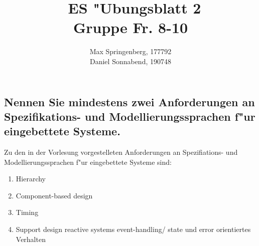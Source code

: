 \documentclass{article}
\author{Max Springenberg, 177792\\
        Daniel Sonnabend, 190748}
\title{\
    ES "Ubungsblatt 2\\
    Gruppe Fr. 8-10
    }
\date{}
\begin{document}
\maketitle
\newpage

\subsection{Nennen Sie mindestens zwei Anforderungen an Spezifikations- und 
            Modellierungssprachen f"ur eingebettete Systeme.}

Zu den in der Vorlesung vorgestelleten Anforderungen an Spezifiations- und 
    Modellierungssprachen f"ur eingebettete Systeme sind:\\
\begin{enumerate}
    \item Hierarchy
    \item Component-based design
    \item Timing
    \item Support design reactive systems
        \subitem event-handling/ state und error orientiertes Verhalten
\end{enumerate}
\end{document}
